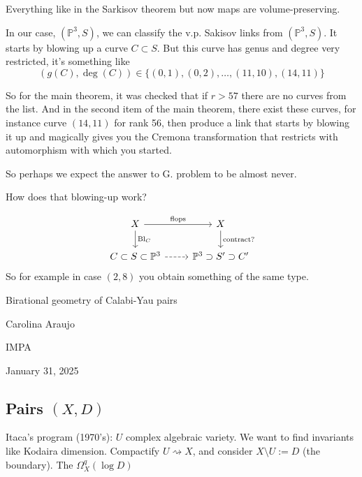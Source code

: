 \begin{thm}\leavevmode
	Everything like in the Sarkisov theorem but now maps are volume-preserving.
\end{thm}

In our case, $(\mathbb{P}^3,S)$, we can classify the v.p. Sakisov links from  $(\mathbb{P}^3,S)$. It starts by blowing up a curve $C\subset S$. But this curve has genus and degree very restricted, it's something like
\[(g(C),\operatorname{deg}(C))\in\{(0,1),(0,2),\ldots,(11,10),(14,11)\}\]

So for the main theorem, it was checked that if $r>57$ there are no curves from the list. And in the second item of the main theorem, there exist these curves, for instance curve  $(14,11)$ for rank 56, then produce a link that starts by blowing it up and magically gives you the Cremona transformation that restricts with automorphism with which you started.

\begin{remark}
	So perhaps we expect the answer to G. problem to be almost never.
\end{remark}

\begin{question}
	How does that blowing-up work?
\end{question}

\[\begin{tikzcd}
	X\arrow[r,"\text{flops}" ]\arrow[d,"\operatorname{Bl}_C"]& X\arrow[d,"\text{contract?}" ]\\
	C\subset S\subset \mathbb{P}^3\arrow[r,dashed]&\mathbb{P}^3\supset S'\supset C'
\end{tikzcd}\]
So for example in case $(2,8)$ you obtain something of the same type.

\clearpage
{}
{\Huge Birational geometry of Calabi-Yau pairs}

\hfill{\Large Carolina Araujo}

{\Large \hfill IMPA}

\hfill{\large January 31, 2025}

\vspace{2em}
\subsection{Pairs \((X,D)\)}
Itaca's program (1970's): \(U\) complex algebraic variety. We want to find invariants like Kodaira dimension. Compactify \(U \rightsquigarrow X\), and consider \(X\setminus U:=D\) (the boundary). The \(\Omega^q_X(\operatorname{log}D)\)

